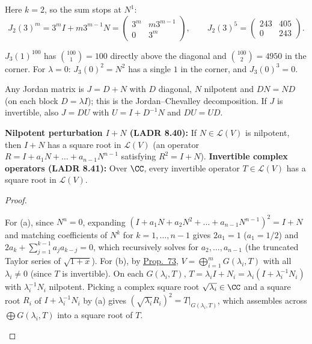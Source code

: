 \documentclass[10pt]{scrartcl}
\newcommand{\LL}{\mathcal L}\newcommand{\PP}{\mathcal P}\newcommand{\MM}{\mathcal M}
\begin{document}
\begin{example*}[Powers of $J_2(3)$]
  Here $k=2$, so the sum stops at $N^1$:
  \[ J_2(3)^m=3^mI+m3^{m-1}N=\begin{pmatrix}3^m&m3^{m-1}\\0&3^m\end{pmatrix},\qquad J_2(3)^5=\begin{pmatrix}243&405\\0&243\end{pmatrix}. \]
\end{example*}

\begin{example*}
  $J_3(1)^{100}$ has $\binom{100}1=100$ directly above the diagonal and $\binom{100}2=4950$ in the corner. For $\lambda=0$: $J_3(0)^2=N^2$ has a single $1$ in the corner, and $J_3(0)^3=0$.
\end{example*}

Any Jordan matrix is $J=D+N$ with $D$ diagonal, $N$ nilpotent and $DN=ND$ (on each block $D=\lambda I$); this is the Jordan--Chevalley decomposition. If $J$ is invertible, also $J=DU$ with $U=I+D^{-1}N$ and $DU=UD$.

\begin{theorem*}
  \begin{enumerate}[(a)]
    \ii \textbf{Nilpotent perturbation $I+N$ (LADR 8.40):} If $N\in\LL(V)$ is nilpotent, then $I+N$ has a square root in $\LL(V)$ (an operator $R=I+a_1N+\dots+a_{n-1}N^{n-1}$ satisfying $R^2=I+N$).
    \ii \textbf{Invertible complex operators (LADR 8.41):} Over $\CC$, every invertible operator $T\in\LL(V)$ has a square root in $\LL(V)$.
  \end{enumerate}
\end{theorem*}
\begin{proof}
  \begin{steps}
    \ii For (a), since $N^n=0$, expanding $(I+a_1N+a_2N^2+\dots+a_{n-1}N^{n-1})^2=I+N$ and matching coefficients of $N^k$ for $k=1,\dots,n-1$ gives $2a_1=1$ ($a_1=1/2$) and $2a_k+\sum_{j=1}^{k-1}a_ja_{k-j}=0$, which recursively solves for $a_2,\dots,a_{n-1}$ (the truncated Taylor series of $\sqrt{1+x}$).
    \ii For (b), by \hyperref[prop-73]{Prop.~73}, $V=\bigoplus_{i=1}^m G(\lambda_i,T)$ with all $\lambda_i\ne 0$ (since $T$ is invertible). On each $G(\lambda_i,T)$, $T=\lambda_iI+N_i=\lambda_i(I+\lambda_i^{-1}N_i)$ with $\lambda_i^{-1}N_i$ nilpotent. Picking a complex square root $\sqrt{\lambda_i}\in\CC$ and a square root $R_i$ of $I+\lambda_i^{-1}N_i$ by (a) gives $(\sqrt{\lambda_i}R_i)^2=T|_{G(\lambda_i,T)}$, which assembles across $\bigoplus G(\lambda_i,T)$ into a square root of $T$.
  \end{steps}
\end{proof}
\end{document}
